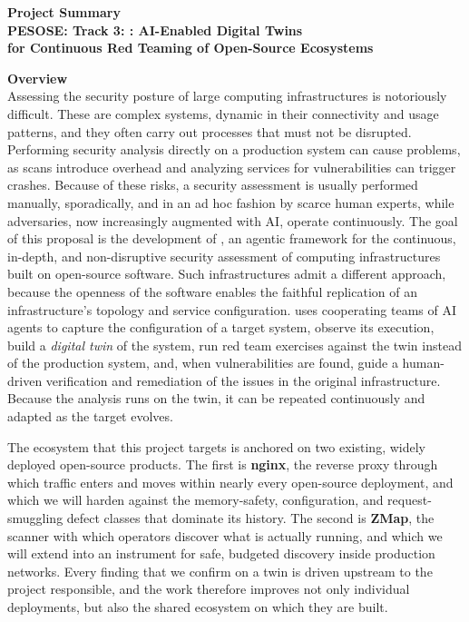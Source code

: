 
\begin{center}
  {\large\bfseries Project Summary}\\[0.3em]
  {\large\bfseries PESOSE: Track 3: \sysname: AI-Enabled Digital Twins \\ 
  for Continuous Red Teaming of Open-Source Ecosystems}
\end{center}

\noindent\textbf{Overview}\\
Assessing the security posture of large computing infrastructures is
notoriously difficult. These are complex systems, dynamic in their
connectivity and usage patterns, and they often carry out processes that must
not be disrupted. Performing security analysis directly on a production
system can cause problems, as scans introduce overhead and analyzing services
for vulnerabilities can trigger crashes. Because of these risks, a security
assessment is usually performed manually, sporadically, and in an ad hoc
fashion by scarce human experts, while adversaries, now increasingly
augmented with AI, operate continuously. The goal of this proposal is the development of \sysname, an agentic framework
for the continuous, in-depth, and non-disruptive security assessment of
computing infrastructures built on open-source software. Such infrastructures admit a different approach, because the openness of the
software enables the faithful replication of an infrastructure's topology and
service configuration. \sysname uses cooperating teams of AI agents to capture the configuration of
a target system, observe its execution, build a \emph{digital twin} of the
system, run red team exercises against the twin instead of the production
system, and, when vulnerabilities are found, guide a human-driven
verification and remediation of the issues in the original infrastructure.
Because the analysis runs on the twin, it can be repeated continuously and
adapted as the target evolves.

The ecosystem that this project targets is anchored on two existing, widely
deployed open-source products. The first is \textbf{nginx}, the reverse proxy
through which traffic enters and moves within nearly every open-source
deployment, and which we will harden against the memory-safety,
configuration, and request-smuggling defect classes that dominate its
history. The second is \textbf{ZMap}, the scanner with which operators
discover what is actually running, and which we will extend into an
instrument for safe, budgeted discovery inside production networks. Every
finding that we confirm on a twin is driven upstream to the project
responsible, and the work therefore improves not only individual deployments,
but also the shared ecosystem on which they are built.


